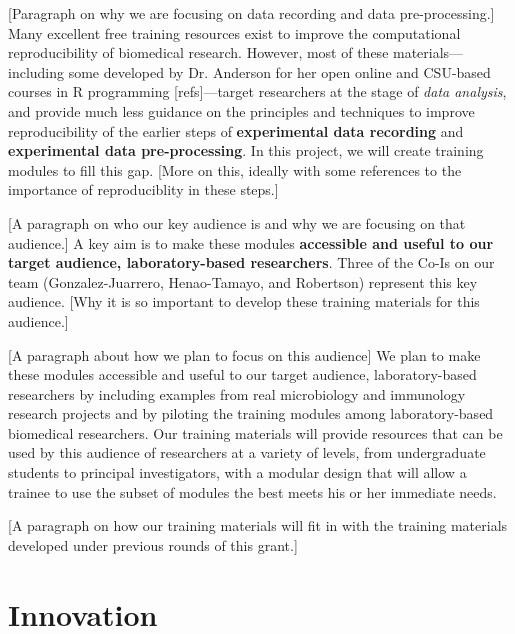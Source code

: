 \documentclass[pdftex,english,11pt,parskip=half]{scrartcl}
\begin{document}
[Paragraph on why we are focusing on data recording and data pre-processing.] Many excellent free training resources exist to improve the computational reproducibility of biomedical research. However, most of these materials---including some developed by Dr. Anderson for her open online and CSU-based courses in R programming [refs]---target researchers at the stage of \textit{data analysis}, and provide much less guidance on the principles and techniques to improve reproducibility of the earlier steps of \textbf{experimental data recording} and \textbf{experimental data pre-processing}. In this project, we will create training modules to fill this gap. [More on this, ideally with some references to the importance of reproduciblity in these steps.]

[A paragraph on who our key audience is and why we are focusing on that audience.] A key aim is to make these modules \textbf{accessible and useful to our target audience, laboratory-based researchers}. Three of the Co-Is on our team (Gonzalez-Juarrero, Henao-Tamayo, and Robertson) represent this key audience. [Why it is so important to develop these training materials for this audience.]

[A paragraph about how we plan to focus on this audience] We plan to make these modules accessible and useful to our target audience, laboratory-based researchers by including examples from real microbiology and immunology research projects and by piloting the training modules among laboratory-based biomedical researchers. Our training materials will provide resources that can be used by this audience of researchers at a variety of levels, from undergraduate students to principal investigators, with a modular design that will allow a trainee to use the subset of modules the best meets his or her immediate needs.

[A paragraph on how our training materials will fit in with the training materials developed under previous rounds of this grant.]

\section{Innovation}
\vspace{-0.1in}
\end{document}
